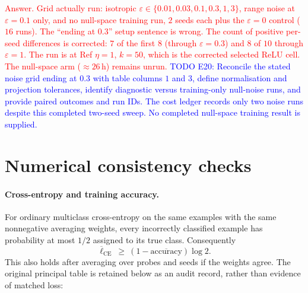 \documentclass{article}
\newcommand{\zied}[1]{\textcolor{blue}{#1}}
\newcommand{\nat}[1]{\textcolor{red}{#1}}
\theoremstyle{definition}
\theoremstyle{remark}
\begin{document}
\nat{Answer. Grid actually run: isotropic $\varepsilon\in\{0.01,0.03,0.1,0.3,1,3\}$, range noise at $\varepsilon=0.1$ only, and no null-space training run, $2$ seeds each plus the $\varepsilon=0$ control ($16$ runs). The ``ending at $0.3$'' setup sentence is wrong. The count of positive per-seed differences is corrected: $7$ of the first $8$ (through $\varepsilon=0.3$) and $8$ of $10$ through $\varepsilon=1$. The run is at Ref $\eta=1$, $k=50$, which is the corrected selected ReLU cell. The null-space arm ($\approx26$\,h) remains unrun.}
\zied{TODO E20: Reconcile the stated noise grid ending at $0.3$ with table columns $1$ and $3$, define normalisation and projection tolerances, identify diagnostic versus training-only null-noise runs, and provide paired outcomes and run IDs. The cost ledger records only two noise runs despite this completed two-seed sweep. No completed null-space training result is supplied.}

\section{Numerical consistency checks}\label{app:metric-audit}

\paragraph{Cross-entropy and training accuracy.}
For ordinary multiclass cross-entropy on the same examples with the same nonnegative averaging weights, every incorrectly classified example has probability at most $1/2$ assigned to its true class. Consequently
\[
 \overline{\ell}_{\mathrm{CE}}\ \geq\ (1-\overline{\mathrm{accuracy}})\log2.
\]
This also holds after averaging over probes and seeds if the weights agree. The original principal table is retained below as an audit record, rather than evidence of matched loss:
\end{document}
